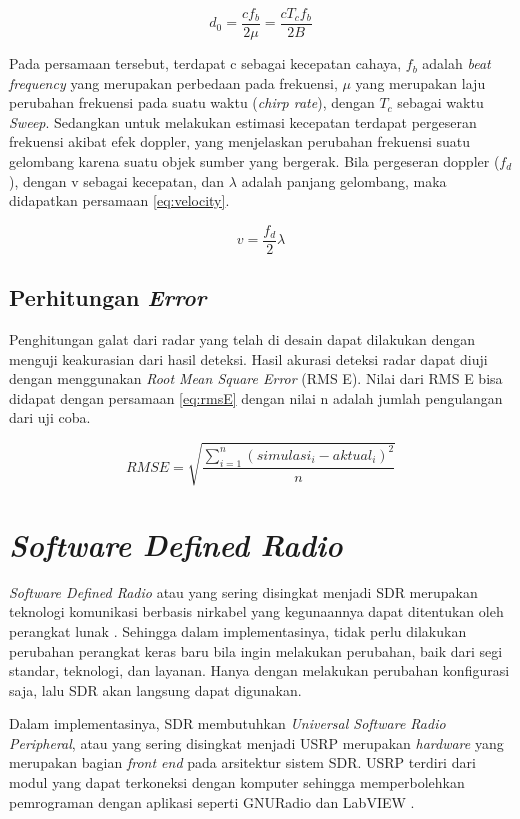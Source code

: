 \begin{equation}
	d_{0} = \frac{c f_{b}}{2 \mu} = \frac{c T_{c} f_{b}}{2 B}
	\label{eq:RangeEst}
\end{equation}

Pada persamaan tersebut, terdapat c sebagai kecepatan cahaya, $f_{b}$ adalah \textit{beat frequency} yang merupakan perbedaan pada frekuensi,  $\mu$ yang merupakan laju perubahan frekuensi pada suatu waktu (\textit{chirp rate}), dengan $T_{c}$ sebagai waktu \textit{Sweep}. Sedangkan untuk melakukan estimasi kecepatan terdapat pergeseran frekuensi akibat efek doppler, yang menjelaskan perubahan frekuensi suatu gelombang karena suatu objek sumber yang bergerak. Bila pergeseran doppler ($f_{d}$), dengan v sebagai kecepatan, dan $\lambda$ adalah panjang gelombang, maka didapatkan persamaan \ref{eq:velocity}.

\begin{equation}
	v = \frac{f_{d}}{2}\lambda
	\label{eq:velocity}
\end{equation}

\subsection{Perhitungan \textit{Error}}
Penghitungan galat dari radar yang telah di desain dapat dilakukan dengan menguji keakurasian dari hasil deteksi. Hasil akurasi deteksi radar dapat diuji dengan menggunakan \textit{Root Mean Square Error} (RMS E). Nilai dari RMS E bisa didapat dengan persamaan \ref{eq:rmsE} dengan nilai n adalah jumlah pengulangan dari uji coba.

\begin{equation}
	RMS E = \sqrt{\frac{\sum_{i = 1}^{n} (simulasi_{i}-aktual_{i})^2}{n}}
	\label{eq:rmsE}
\end{equation}

\section{\textit{Software Defined Radio}}
\textit{Software Defined Radio} atau yang sering disingkat menjadi SDR merupakan teknologi komunikasi berbasis nirkabel yang kegunaannya dapat ditentukan oleh perangkat lunak \cite{Anisah2018}. Sehingga dalam implementasinya, tidak perlu dilakukan perubahan perangkat keras baru bila ingin melakukan perubahan, baik dari segi standar, teknologi, dan layanan. Hanya dengan melakukan perubahan konfigurasi saja, lalu SDR akan langsung dapat digunakan. 

Dalam implementasinya, SDR membutuhkan \textit{Universal Software Radio Peripheral}, atau yang sering disingkat menjadi USRP merupakan \textit{hardware} yang merupakan bagian \textit{front end} pada arsitektur sistem SDR. USRP terdiri dari modul yang dapat terkoneksi dengan komputer sehingga memperbolehkan pemrograman dengan aplikasi seperti GNURadio dan LabVIEW \cite{Gulo2023}. 

